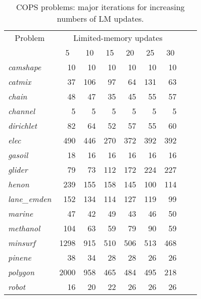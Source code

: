 \documentclass[draft,leqno,onefignum,onetabnum]{siamltex}
\def\strut{\rule[-1.25ex]{0pt}{4ex}}%
\def\strutu{\rule{0pt}{3ex}}%
\def\Cute#1{\hbox{\it\lowercase{#1}\/}}
\begin{document}
\begin{table}[p]
\caption{\label{table_COPS_LM_major} COPS problems: major iterations for increasing
  numbers of LM updates.}
\begin{center}  \footnotesize %
\begin{tabular}{|l|r|r|r|r|r|r|r|r|}\hline
 \multicolumn{1}{|c|}{\strut Problem}&
 \multicolumn{6}{c|}{Limited-memory updates}\\\cline{2-7}
 \multicolumn{1}{|c|}{\strut }&
 \multicolumn{1}{c|}{ 5}&
 \multicolumn{1}{c|}{10}&
 \multicolumn{1}{c|}{15}&
 \multicolumn{1}{c|}{20}&
 \multicolumn{1}{c|}{25}&
 \multicolumn{1}{c|}{30}\\\hline\strutu%
               \Cute{camshape}   &    10 &   10 &   10 &   10 &   10 &   10
\\             \Cute{catmix}     &    37 &  106 &   97 &   64 &  131 &   63
\\             \Cute{chain}      &    48 &   47 &   35 &   45 &   55 &   57
\\             \Cute{channel}    &     5 &    5 &    5 &    5 &    5 &    5
\\             \Cute{dirichlet}  &    82 &   64 &   52 &   57 &   55 &   60
\\             \Cute{elec}       &   490 &  446 &  270 &  372 &  392 &  392
\\             \Cute{gasoil}     &    18 &   16 &   16 &   16 &   16 &   16
\\             \Cute{glider}     &    79 &   73 &  112 &  172 &  224 &  227
\\             \Cute{henon}      &   239 &  155 &  158 &  145 &  100 &  114
\\             \Cute{lane\_emden}&   152 &  134 &  114 &  127 &  119 &   99
\\             \Cute{marine}     &    47 &   42 &   49 &   43 &   46 &   50
\\             \Cute{methanol}   &   104 &   63 &   59 &   79 &   90 &   59
\\             \Cute{minsurf}    &  1298 &  915 &  510 &  506 &  513 &  468
\\             \Cute{pinene}     &    38 &   34 &   28 &   28 &   26 &   26
\\             \Cute{polygon}    &  2000 &  958 &  465 &  484 &  495 &  218
\\             \Cute{robot}      &    16 &   20 &   22 &   26 &   26 &   26

\end{tabular}
\end{center}
\end{table}
\end{document}
